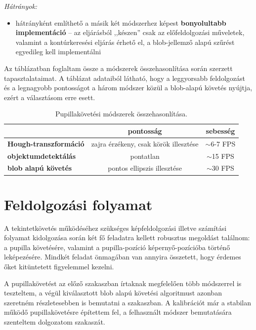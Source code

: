 \emph{Hátrányok:}

\begin{itemize}
  \item hátrányként említhető a másik két módszerhez képest \textbf{bonyolultabb implementáció} -- az eljárásból ,,készen'' csak az előfeldolgozási műveletek, valamint a kontúrkeresési eljárás érhető el, a blob-jellemző alapú szűrést egyedileg kell implementálni
\end{itemize}

\medskip

Az  táblázatban foglaltam össze a módszerek összehasonlítása során szerzett tapasztalataimat. A táblázat adataiból látható, hogy a leggyorsabb feldolgozást és a legnagyobb pontosságot a három módszer közül a blob-alapú követés nyújtja, ezért a választásom erre esett.

\begin{table}[ht]
	\centering
	\caption{Pupillakövetési módszerek összehasonlítása.} \label{tab:modsz}
	\begin{tabular}{ l | c | c }
	 & pontosság & sebesség \\ \hline \hline
	\textbf{Hough-transzformáció} & zajra érzékeny, csak körök illesztése & $\sim$6-7 FPS \\
	\textbf{objektumdetektálás} & pontatlan & $\sim$15 FPS  \\
	\textbf{blob alapú követés} & pontos ellipszis illesztése & $\sim$30 FPS \\
	\end{tabular}
\end{table}

\section{Feldolgozási folyamat}\label{sect:feld_folyamat}

A tekintetkövetés működéséhez szükséges képfeldolgozási illetve számítási folyamat kidolgozása során két fő feladatra kellett robusztus megoldást találnom: a pupilla követésére, valamint a pupilla-pozíció képernyő-pozícióba történő leképezésére. Mindkét feladat önmagában van annyira összetett, hogy érdemes őket kitüntetett figyelemmel kezelni.

A pupillakövetést az előző szakaszban írtaknak megfelelően több módszerrel is teszteltem, a végül kiválasztott blob alapú követési algoritmust azonban szeretném részletesebben is bemutatni a  szakaszban. A kalibrációt már a stabilan működő pupillakövetésre építettem fel, a felhasznált módszer bemutatására szenteltem dolgozatom  szakaszát.

